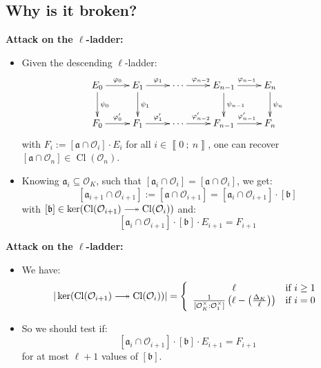 \documentclass[10pt]{beamer}
\theoremstyle{plain}
\theoremstyle{definition}
\newcommand{\mO}{\mathcal{O}}
\renewcommand{\i}[2]{\left\llbracket #1~;~#2\right\rrbracket}
\renewcommand{\(}{\left(}
\renewcommand{\)}{\right)}
\newcommand{\mf}[1]{\mathfrak{#1}}
\DeclareMathOperator{\Cl}{Cl}
\begin{document}
\subsection{Why is it broken?}

\begin{frame}
\textbf{Attack on the $\ell$-ladder:}

\vspace{0.5cm}

\begin{itemize}
\item Given the descending $\ell$-ladder:
\[\xymatrix{
E_0 \ar[d]^{\psi_0} \ar[r]^{\varphi_0} & E_1\ar[d]^{\psi_1} \ar[r]^{\varphi_{1}}& \cdots \ar[r]^{\varphi_{n-2}} & E_{n-1} \ar[d]^{\psi_{n-1}} \ar[r]^{\varphi_{n-1}} & E_n \ar[d]^{\psi_n}\\
F_0 \ar[r]^{\varphi'_0} & F_1 \ar[r]^{\varphi'_{1}}& \cdots \ar[r]^{\varphi'_{n-2}} & F_{n-1} \ar[r]^{\varphi'_{n-1}} & F_n
}\]
with $F_i:=[\mf{a}\cap \mO_i]\cdot E_i$ for all $i\in\i{0}{n}$, one can recover $[\mf{a}\cap \mO_n]\in\Cl(\mO_n)$.

\item Knowing $\mf{a}_i\subseteq \mO_K$, such that $[\mf{a}_i\cap\mO_i]=[\mf{a}\cap \mO_i]$, we get:
\[[\mf{a}_{i+1}\cap\mO_{i+1}]:=[\mf{a}\cap \mO_{i+1}]=[\mf{a}_i\cap\mO_{i+1}]\cdot[\mf{b}]\]
with $[\mf{b}]\in\ker(\Cl(\mO_{i+1})\relbar\joinrel\twoheadrightarrow\Cl(\mO_{i}))$ and:
\[[\mf{a}_i\cap\mO_{i+1}]\cdot[\mf{b}]\cdot E_{i+1}=F_{i+1}\]
\end{itemize}

\end{frame}

\begin{frame}

\textbf{Attack on the $\ell$-ladder:}

\vspace{0.5cm}


\begin{itemize}
\item We have:
\[|\ker(\Cl(\mO_{i+1})\relbar\joinrel\twoheadrightarrow\Cl(\mO_{i}))|=\left\{ \begin{array}{cc} 
\ell & \mbox{if } i\geq 1\\
\frac{1}{[\mO_K^\times:\mO_1^\times]}\(\ell-\(\frac{\Delta_K}{\ell}\)\) & \mbox{if } i=0
\end{array}\right.\]

\item So we should test if:
\[[\mf{a}_i\cap\mO_{i+1}]\cdot[\mf{b}]\cdot E_{i+1}=F_{i+1}\]
for at most $\ell+1$ values of $[\mf{b}]$.
\end{itemize}


\end{frame}
\end{document}
